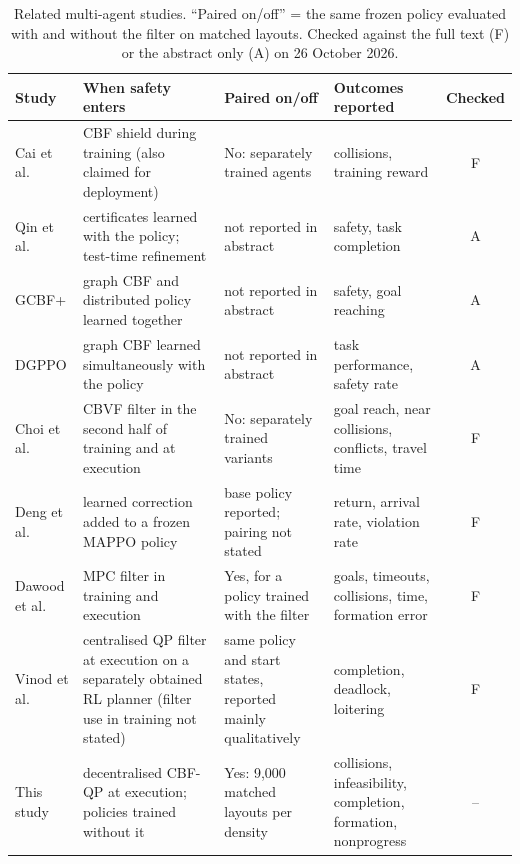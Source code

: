 \documentclass[11pt]{article}
\begin{document}
\begin{table}[t]
\centering\small
\caption{Related multi-agent studies. ``Paired on/off'' = the same frozen policy evaluated with and
without the filter on matched layouts. Checked against the full text (F) or the abstract only (A) on
26 October 2026.}
\label{tab:related}
\footnotesize
\begin{tabular}{>{\raggedright\arraybackslash}p{2.2cm}>{\raggedright\arraybackslash}p{4.0cm}>{\raggedright\arraybackslash}p{3.4cm}>{\raggedright\arraybackslash}p{3.6cm}c}
\toprule
Study & When safety enters & Paired on/off & Outcomes reported & Checked\\
\midrule
Cai et al. \cite{cai2021} & CBF shield during training (also claimed for deployment) & No: separately trained agents & collisions, training reward & F\\
Qin et al. \cite{qin2021} & certificates learned with the policy; test-time refinement & not reported in abstract & safety, task completion & A\\
GCBF+ \cite{zhang2025gcbf} & graph CBF and distributed policy learned together & not reported in abstract & safety, goal reaching & A\\
DGPPO \cite{zhang2025dgppo} & graph CBF learned simultaneously with the policy & not reported in abstract & task performance, safety rate & A\\
Choi et al. \cite{choi2025} & CBVF filter in the second half of training and at execution & No: separately trained variants & goal reach, near collisions, conflicts, travel time & F\\
Deng et al. \cite{deng2026} & learned correction added to a frozen MAPPO policy & base policy reported; pairing not stated & return, arrival rate, violation rate & F\\
Dawood et al. \cite{dawood2025} & MPC filter in training and execution & Yes, for a policy trained with the filter & goals, timeouts, collisions, time, formation error & F\\
Vinod et al. \cite{vinod2022} & centralised QP filter at execution on a separately obtained RL planner (filter use in training not stated) & same policy and start states, reported mainly qualitatively & completion, deadlock, loitering & F\\
This study & decentralised CBF-QP at execution; policies trained without it & Yes: 9{,}000 matched layouts per density & collisions, infeasibility, completion, formation, nonprogress & --\\
\bottomrule
\end{tabular}
\end{table}
\end{document}
